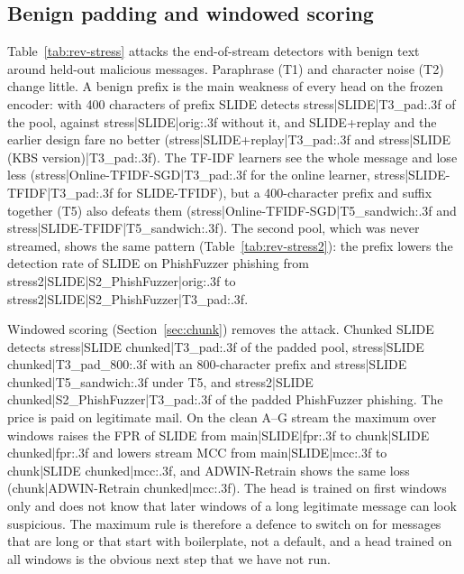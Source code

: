 {{{{{{\subsection{Benign padding and windowed scoring}\label{sec:stress}
Table~\ref{tab:rev-stress} attacks the end-of-stream detectors with benign text around held-out malicious messages. Paraphrase (T1) and character noise (T2) change little. A benign prefix is the main weakness of every head on the frozen encoder: with 400 characters of prefix SLIDE detects {{stress|SLIDE|T3_pad:.3f}} of the pool, against {{stress|SLIDE|orig:.3f}} without it, and SLIDE+replay and the earlier design fare no better ({{stress|SLIDE+replay|T3_pad:.3f}} and {{stress|SLIDE (KBS version)|T3_pad:.3f}}). The TF-IDF learners see the whole message and lose less ({{stress|Online-TFIDF-SGD|T3_pad:.3f}} for the online learner, {{stress|SLIDE-TFIDF|T3_pad:.3f}} for SLIDE-TFIDF), but a 400-character prefix and suffix together (T5) also defeats them ({{stress|Online-TFIDF-SGD|T5_sandwich:.3f}} and {{stress|SLIDE-TFIDF|T5_sandwich:.3f}}). The second pool, which was never streamed, shows the same pattern (Table~\ref{tab:rev-stress2}): the prefix lowers the detection rate of SLIDE on PhishFuzzer phishing from {{stress2|SLIDE|S2_PhishFuzzer|orig:.3f}} to {{stress2|SLIDE|S2_PhishFuzzer|T3_pad:.3f}}.



Windowed scoring (Section~\ref{sec:chunk}) removes the attack. Chunked SLIDE detects {{stress|SLIDE chunked|T3_pad:.3f}} of the padded pool, {{stress|SLIDE chunked|T3_pad_800:.3f}} with an 800-character prefix and {{stress|SLIDE chunked|T5_sandwich:.3f}} under T5, and {{stress2|SLIDE chunked|S2_PhishFuzzer|T3_pad:.3f}} of the padded PhishFuzzer phishing. The price is paid on legitimate mail. On the clean A--G stream the maximum over windows raises the FPR of SLIDE from {{main|SLIDE|fpr:.3f}} to {{chunk|SLIDE chunked|fpr:.3f}} and lowers stream MCC from {{main|SLIDE|mcc:.3f}} to {{chunk|SLIDE chunked|mcc:.3f}}, and ADWIN-Retrain shows the same loss ({{chunk|ADWIN-Retrain chunked|mcc:.3f}}). The head is trained on first windows only and does not know that later windows of a long legitimate message can look suspicious. The maximum rule is therefore a defence to switch on for messages that are long or that start with boilerplate, not a default, and a head trained on all windows is the obvious next step that we have not run.



}}}}}}
